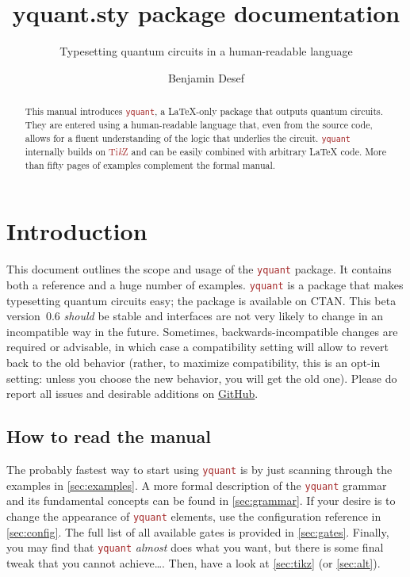 \documentclass{scrartcl}
\title{yquant.sty package documentation}
\subtitle{Typesetting quantum circuits in a human-readable language}
\author{Benjamin Desef}
\makeatletter
\def\TikZ{\textcolor{brown}{Ti\textit kZ}}
\def\pkg#1{\textcolor{brown}{\texttt{#1}}}
\def\Yquant{\pkg{yquant}}
\newcommand*{\the@orig@section}{}
\let\the@orig@section=\section
\renewcommand*{\section}{%
   \clearpage%
   \the@orig@section%
}
\makeatother
\begin{document}
   \maketitle
   \begin{abstract}
      \noindent This manual introduces \Yquant, a \LaTeX\hyp only package that outputs quantum circuits.
      They are entered using a human\hyp readable language that, even from the source code, allows for a fluent understanding of the logic that underlies the circuit.
      \Yquant{} internally builds on \TikZ{} and can be easily combined with arbitrary \LaTeX{} code.
      More than fifty pages of examples complement the formal manual.
   \end{abstract}
   \tableofcontents

   \section{Introduction}
      This document outlines the scope and usage of the \Yquant{} package.
      It contains both a reference and a huge number of examples.
      \Yquant{} is a package that makes typesetting quantum circuits easy; the package is available on CTAN.
      This beta version~0.6 \emph{should} be stable and interfaces are not very likely to change in an incompatible way in the future.
      Sometimes, backwards\hyp incompatible changes are required or advisable, in which case a compatibility setting will allow to revert back to the old behavior (rather, to maximize compatibility, this is an opt\hyp in setting: unless you choose the new behavior, you will get the old one).
      Please do report all issues and desirable additions on \href{https://github.com/projekter/yquant/issues}{GitHub}.

      \subsection{How to read the manual}
         The probably fastest way to start using \Yquant{} is by just scanning through the examples in \cref{sec:examples}.
         A more formal description of the \Yquant{} grammar and its fundamental concepts can be found in \cref{sec:grammar}.
         If your desire is to change the appearance of \Yquant{} elements, use the configuration reference in \cref{sec:config}.
         The full list of all available gates is provided in \cref{sec:gates}.
         Finally, you may find that \Yquant{} \emph{almost} does what you want, but there is some final tweak that you cannot achieve\dots.
         Then, have a look at \cref{sec:tikz} (or \cref{sec:alt}).
\end{document}
